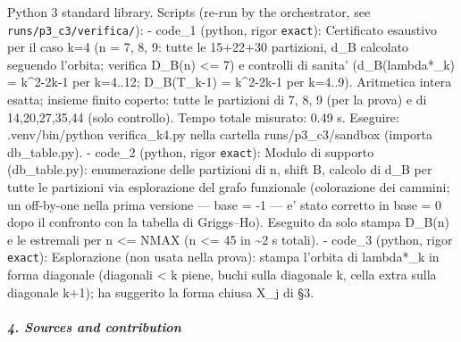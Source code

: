 \documentclass[11pt,a4paper]{article}
\begin{document}
Python 3 standard library. Scripts (re-run by the orchestrator, see
\texttt{runs/p3\_c3/verifica/}): - code\_1 (python, rigor
\texttt{exact}): Certificato esaustivo per il caso k=4 (n = 7, 8, 9:
tutte le 15+22+30 partizioni, d\_B calcolato seguendo l'orbita; verifica
D\_B(n) \textless= 7) e controlli di sanita' (d\_B(lambda*\_k) =
k\^{}2-2k-1 per k=4..12; D\_B(T\_k-1) = k\^{}2-2k-1 per k=4..9).
Aritmetica intera esatta; insieme finito coperto: tutte le partizioni di
7, 8, 9 (per la prova) e di 14,20,27,35,44 (solo controllo). Tempo
totale misurato: 0.49 s. Eseguire: .venv/bin/python verifica\_k4.py
nella cartella runs/p3\_c3/sandbox (importa db\_table.py). - code\_2
(python, rigor \texttt{exact}): Modulo di supporto (db\_table.py):
enumerazione delle partizioni di n, shift B, calcolo di d\_B per tutte
le partizioni via esplorazione del grafo funzionale (colorazione dei
cammini; un off-by-one nella prima versione --- base = -1 --- e' stato
corretto in base = 0 dopo il confronto con la tabella di Griggs--Ho).
Eseguito da solo stampa D\_B(n) e le estremali per n \textless= NMAX (n
\textless= 45 in \textasciitilde2 s totali). - code\_3 (python, rigor
\texttt{exact}): Esplorazione (non usata nella prova): stampa l'orbita
di lambda*\_k in forma diagonale (diagonali \textless{} k piene, buchi
sulla diagonale k, cella extra sulla diagonale k+1); ha suggerito la
forma chiusa X\_j di §3.

\subparagraph{4. Sources and
contribution}\label{sources-and-contribution}
\end{document}

